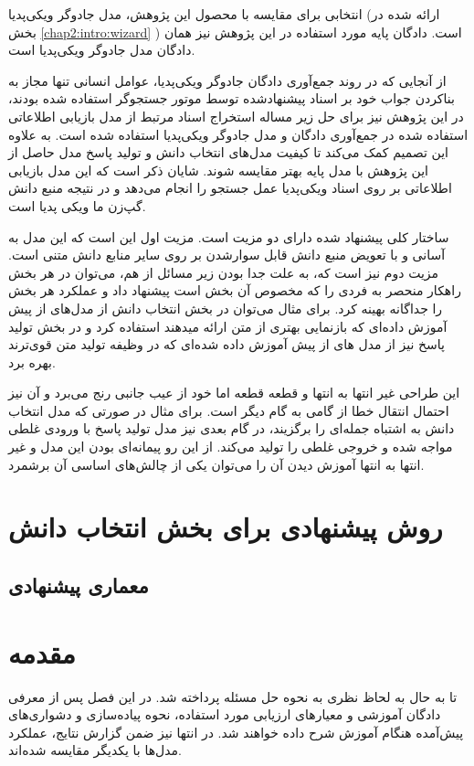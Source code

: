 انتخابی برای مقایسه با محصول این پژوهش، مدل جادوگر ویکی‌پدیا (ارائه شده در بخش 
\ref{chap2:intro:wizard}
)
است. دادگان پایه مورد استفاده در این پژوهش نیز همان دادگان مدل جادوگر ویکی‌پدیا است. 

از آنجایی که در روند جمع‌آوری دادگان جادوگر ویکی‌پدیا،‌ عوامل انسانی تنها مجاز به بناکردن جواب خود بر اسناد پیشنهاد‌شده توسط موتور جستجوگر استفاده شده بودند، در این پژوهش نیز
برای حل زیر مساله استخراج اسناد مرتبط
از مدل بازیابی اطلاعاتی 
استفاده شده در جمع‌آوری دادگان و مدل جادوگر ویکی‌پدیا استفاده شده است. به علاوه این تصمیم کمک می‌کند تا کیفیت مدل‌های انتخاب دانش و تولید پاسخ مدل حاصل از این پژوهش با مدل پایه بهتر مقایسه شوند. شایان ذکر است که این مدل بازیابی اطلاعاتی بر روی اسناد ویکی‌پدیا عمل جستجو را انجام می‌دهد و در نتیجه منبع دانش گپ‌زن ما ویکی پدیا است.

ساختار کلی پیشنهاد شده دارای دو مزیت است. مزیت اول این است که این مدل
به آسانی و با تعویض منبع دانش قابل سوارشدن بر روی سایر منابع دانش متنی است. مزیت دوم نیز است که، به علت جدا بودن زیر مسائل از هم، می‌توان در هر بخش راهکار منحصر به فردی را که مخصوص آن بخش است پیشنهاد داد و عملکرد هر بخش را جداگانه بهینه کرد. برای مثال می‌توان در بخش انتخاب دانش از مدل‌های از پیش آموزش داده‌ای که بازنمایی بهتری از متن ارائه میدهند استفاده کرد و در بخش تولید پاسخ نیز از مدل های از پیش آموزش داده شده‌ای که در وظیفه تولید متن قوی‌ترند بهره برد.

این طراحی غیر انتها به انتها و قطعه قطعه اما خود از عیب جانبی رنج می‌برد و آن نیز احتمال انتقال خطا از گامی به گام دیگر است. برای مثال در صورتی که مدل انتخاب دانش به اشتباه جمله‌ای را برگزیند، در گام بعدی نیز مدل تولید پاسخ با ورودی غلطی مواجه شده و خروجی غلطی را تولید می‌کند. از این رو پیمانه‌ای بودن این مدل و غیر انتها به انتها آموزش دیدن آن را می‌توان یکی از چالش‌های اساسی آن برشمرد.
\section{روش پیشنهادی برای بخش انتخاب دانش}

\subsection{معماری پیشنهادی}

\subsection{}

\section{مقدمه}
تا به حال به لحاظ نظری به نحوه حل مسئله پرداخته شد. در این فصل پس از معرفی دادگان آموزشی و معیارهای ارزیابی مورد استفاده، نحوه پیاده‌سازی و دشواری‌های پیش‌آمده هنگام آموزش شرح داده خواهند شد. در انتها نیز ضمن گزارش نتایج، عملکرد مدل‌ها با یکدیگر مقایسه شده‌اند.
